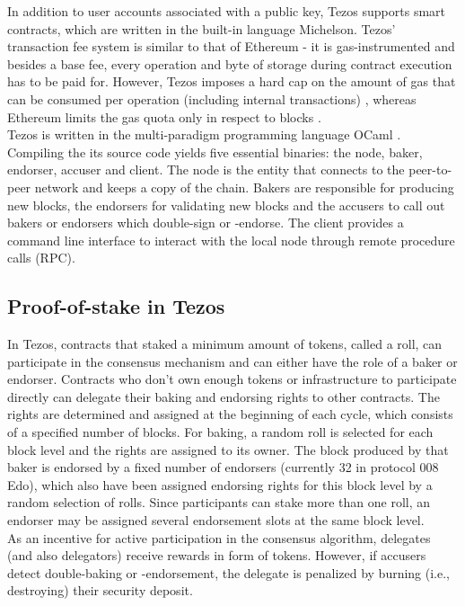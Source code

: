 In addition to user accounts associated with a public key, Tezos supports smart contracts, which are written in the built-in language Michelson. Tezos' transaction fee system is similar to that of Ethereum \cite{wood_ethereum_2021} - it is gas-instrumented and besides a base fee, every operation and byte of storage during contract execution has to be paid for. However, Tezos imposes a hard cap on the amount of gas that can be consumed per operation (including internal transactions) \cite{tezos_docs}\cite{morley_repo}, whereas Ethereum limits the gas quota only in respect to blocks \cite{wood_ethereum_2021}.\\
Tezos is written in the multi-paradigm programming language OCaml \cite{ocaml_doc}. Compiling the its source code yields five essential binaries: the node, baker, endorser, accuser and client. The node is the entity that connects to the peer-to-peer network and keeps a copy of the chain. Bakers are responsible for producing new blocks, the endorsers for validating new blocks and the accusers to call out bakers or endorsers which double-sign or -endorse. The client provides a command line interface to interact with the local node through remote procedure calls (RPC).

\subsection{Proof-of-stake in Tezos}
In Tezos, contracts that staked a minimum amount of tokens, called a roll, can participate in the consensus mechanism and can either have the role of a baker or endorser. Contracts who don't own enough tokens or infrastructure to participate directly can delegate their baking and endorsing rights to other contracts. The rights are determined and assigned at the beginning of each cycle, which consists of a specified number of blocks. For baking, a random roll is selected for each block level and the rights are assigned to its owner. The block produced by that baker is endorsed by a fixed number of endorsers (currently 32 in protocol 008 Edo), which also have been assigned endorsing rights for this block level by a random selection of rolls. Since participants can stake more than one roll, an endorser may be assigned several endorsement slots at the same block level. \\
As an incentive for active participation in the consensus algorithm, delegates (and also delegators) receive rewards in form of tokens. However, if accusers detect double-baking or -endorsement, the delegate is penalized by burning (i.e., destroying) their security deposit. \cite{tezos_docs}

